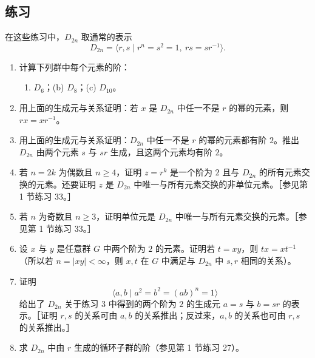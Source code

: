 \subsection*{练习}

在这些练习中，$D_{2n}$ 取通常的表示
\[
  D_{2n}=\langle r,s\mid r^n=s^2=1,\ rs=sr^{-1}\rangle.
\]
\begin{enumerate}[label=\arabic*.]
  \item 计算下列群中每个元素的阶：
  \begin{enumerate}[label=(\alph*)]
    \item $D_6$；\quad (b) $D_8$；\quad (c) $D_{10}$。
  \end{enumerate}
  \item 用上面的生成元与关系证明：若 $x$ 是 $D_{2n}$ 中任一不是 $r$ 的幂的元素，则 $rx=xr^{-1}$。
  \item 用上面的生成元与关系证明：$D_{2n}$ 中任一不是 $r$ 的幂的元素都有阶 $2$。推出 $D_{2n}$ 由两个元素 $s$ 与 $sr$ 生成，且这两个元素均有阶 $2$。
  \item 若 $n=2k$ 为偶数且 $n\geq4$，证明 $z=r^k$ 是一个阶为 $2$ 且与 $D_{2n}$ 的所有元素交换的元素。还要证明 $z$ 是 $D_{2n}$ 中唯一与所有元素交换的非单位元素。［参见第 1 节练习 33。］
  \item 若 $n$ 为奇数且 $n\geq3$，证明单位元是 $D_{2n}$ 中唯一与所有元素交换的元素。［参见第 1 节练习 33。］
  \item 设 $x$ 与 $y$ 是任意群 $G$ 中两个阶为 $2$ 的元素。证明若 $t=xy$，则 $tx=xt^{-1}$（所以若 $n=|xy|<\infty$，则 $x,t$ 在 $G$ 中满足与 $D_{2n}$ 中 $s,r$ 相同的关系）。
  \item 证明
  \[
    \langle a,b\mid a^2=b^2=(ab)^n=1\rangle
  \]
  给出了 $D_{2n}$ 关于练习 3 中得到的两个阶为 $2$ 的生成元 $a=s$ 与 $b=sr$ 的表示。［证明 $r,s$ 的关系可由 $a,b$ 的关系推出；反过来，$a,b$ 的关系也可由 $r,s$ 的关系推出。］
  \item 求 $D_{2n}$ 中由 $r$ 生成的循环子群的阶（参见第 1 节练习 27）。
\end{enumerate}

